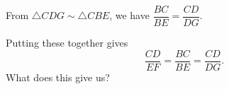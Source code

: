 

From $\triangle CDG \sim \triangle CBE$, we have $\dfrac{BC}{BE} = \dfrac{CD}{DG}$.

Putting these together gives $$ \dfrac{CD}{EF }= \dfrac{BC}{BE} = \dfrac{CD}{DG}. $$  What does this give us?




















